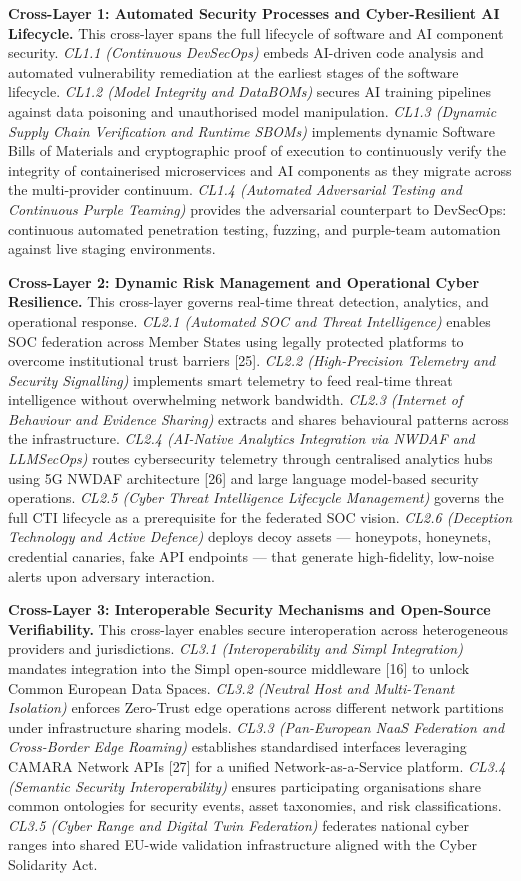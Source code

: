 \documentclass{ieeeaccess}
\begin{document}
\textbf{Cross-Layer 1: Automated Security Processes and Cyber-Resilient
AI Lifecycle.} This cross-layer spans the full lifecycle of software and
AI component security. \emph{CL1.1 (Continuous DevSecOps)} embeds
AI-driven code analysis and automated vulnerability remediation at the
earliest stages of the software lifecycle. \emph{CL1.2 (Model Integrity
and DataBOMs)} secures AI training pipelines against data poisoning and
unauthorised model manipulation. \emph{CL1.3 (Dynamic Supply Chain
Verification and Runtime SBOMs)} implements dynamic Software Bills of
Materials and cryptographic proof of execution to continuously verify
the integrity of containerised microservices and AI components as they
migrate across the multi-provider continuum. \emph{CL1.4 (Automated
Adversarial Testing and Continuous Purple Teaming)} provides the
adversarial counterpart to DevSecOps: continuous automated penetration
testing, fuzzing, and purple-team automation against live staging
environments.

\textbf{Cross-Layer 2: Dynamic Risk Management and Operational Cyber
Resilience.} This cross-layer governs real-time threat detection,
analytics, and operational response. \emph{CL2.1 (Automated SOC and
Threat Intelligence)} enables SOC federation across Member States using
legally protected platforms to overcome institutional trust barriers
{[}25{]}. \emph{CL2.2 (High-Precision Telemetry and Security
Signalling)} implements smart telemetry to feed real-time threat
intelligence without overwhelming network bandwidth. \emph{CL2.3
(Internet of Behaviour and Evidence Sharing)} extracts and shares
behavioural patterns across the infrastructure. \emph{CL2.4 (AI-Native
Analytics Integration via NWDAF and LLMSecOps)} routes cybersecurity
telemetry through centralised analytics hubs using 5G NWDAF architecture
{[}26{]} and large language model-based security operations. \emph{CL2.5
(Cyber Threat Intelligence Lifecycle Management)} governs the full CTI
lifecycle as a prerequisite for the federated SOC vision. \emph{CL2.6
(Deception Technology and Active Defence)} deploys decoy assets ---
honeypots, honeynets, credential canaries, fake API endpoints --- that
generate high-fidelity, low-noise alerts upon adversary interaction.

\textbf{Cross-Layer 3: Interoperable Security Mechanisms and Open-Source
Verifiability.} This cross-layer enables secure interoperation across
heterogeneous providers and jurisdictions. \emph{CL3.1 (Interoperability
and Simpl Integration)} mandates integration into the Simpl open-source
middleware {[}16{]} to unlock Common European Data Spaces. \emph{CL3.2
(Neutral Host and Multi-Tenant Isolation)} enforces Zero-Trust edge
operations across different network partitions under infrastructure
sharing models. \emph{CL3.3 (Pan-European NaaS Federation and
Cross-Border Edge Roaming)} establishes standardised interfaces
leveraging CAMARA Network APIs {[}27{]} for a unified
Network-as-a-Service platform. \emph{CL3.4 (Semantic Security
Interoperability)} ensures participating organisations share common
ontologies for security events, asset taxonomies, and risk
classifications. \emph{CL3.5 (Cyber Range and Digital Twin Federation)}
federates national cyber ranges into shared EU-wide validation
infrastructure aligned with the Cyber Solidarity Act.
\end{document}
